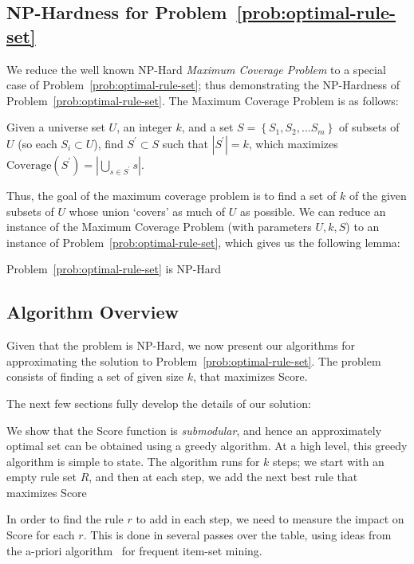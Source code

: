 \subsection{NP-Hardness for Problem~\ref{prob:optimal-rule-set}}
We reduce the well known NP-Hard {\em Maximum Coverage Problem} to a special case of Problem~\ref{prob:optimal-rule-set};
thus demonstrating the NP-Hardness of Problem~\ref{prob:optimal-rule-set}. The Maximum Coverage Problem is as follows: 
\begin{problem}\label{prob:maximum-coverage}
Given a universe set $U$, an integer $k$, and a set $S = \left\lbrace S_1, S_2, ... S_m \right\rbrace$ of subsets of $U$ (so each $S_i \subset U$), find $S^{\prime} \subset S$ such that $|S^{\prime}| = k$, which maximizes $\text{Coverage}(S^{\prime}) = |\bigcup_{s \in S^{\prime}} s|$.
\end{problem}
Thus, the goal of the maximum coverage problem is to find a set of $k$ of the given subsets of $U$ whose union `covers' as much of $U$ as possible. We can reduce an instance of the Maximum Coverage Problem (with parameters $U, k, S$) to an instance of Problem~\ref{prob:optimal-rule-set}, which gives us the following lemma:
\begin{lemma}
Problem~\ref{prob:optimal-rule-set} is NP-Hard
\end{lemma}

\subsection{Algorithm Overview}\label{sec:alg-overview}
Given that the problem is NP-Hard, we now present our algorithms 
for approximating the solution to Problem~\ref{prob:optimal-rule-set}. 
The problem consists of finding a set of given size $k$, that maximizes 
Score. 


The next few sections fully develop the
details of our solution:

\squishlist
\item We show that the Score function is {\em submodular}, and hence an approximately optimal set can be obtained using a greedy algorithm. At a high level, this greedy algorithm is simple to state. The algorithm runs for $k$ steps;
we start with an empty rule set $R$, and then at each step, we add the next best rule that maximizes Score
 
\item In order to find the rule $r$ to add in each step, we need to measure the impact on Score for each $r$. This is done in several passes over the table, using ideas from the a-priori algorithm~\cite{apriori} for frequent item-set mining. 
\squishend

